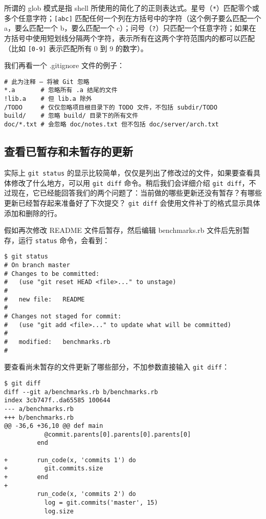 \documentclass[a4paper]{book}
\begin{document}
所谓的 glob 模式是指 shell 所使用的简化了的正则表达式。星号（\texttt{*}）匹配零个或多个任意字符；\texttt{{[}abc{]}} 匹配任何一个列在方括号中的字符（这个例子要么匹配一个 a，要么匹配一个 b，要么匹配一个 c）；问号（\texttt{?}）只匹配一个任意字符；如果在方括号中使用短划线分隔两个字符，表示所有在这两个字符范围内的都可以匹配（比如 \texttt{{[}0-9{]}} 表示匹配所有 0 到 9 的数字）。

我们再看一个 .gitignore 文件的例子：

\begin{shaded}\begin{verbatim}
# 此为注释 – 将被 Git 忽略
*.a       # 忽略所有 .a 结尾的文件
!lib.a    # 但 lib.a 除外
/TODO     # 仅仅忽略项目根目录下的 TODO 文件，不包括 subdir/TODO
build/    # 忽略 build/ 目录下的所有文件
doc/*.txt # 会忽略 doc/notes.txt 但不包括 doc/server/arch.txt
\end{verbatim}\end{shaded}

\subsection{查看已暂存和未暂存的更新}

实际上 \texttt{git status} 的显示比较简单，仅仅是列出了修改过的文件，如果要查看具体修改了什么地方，可以用 \texttt{git diff} 命令。稍后我们会详细介绍 \texttt{git diff}，不过现在，它已经能回答我们的两个问题了：当前做的哪些更新还没有暂存？有哪些更新已经暂存起来准备好了下次提交？ \texttt{git diff} 会使用文件补丁的格式显示具体添加和删除的行。

假如再次修改 README 文件后暂存，然后编辑 benchmarks.rb 文件后先别暂存，运行 \texttt{status} 命令，会看到：

\begin{shaded}\begin{verbatim}
$ git status
# On branch master
# Changes to be committed:
#   (use "git reset HEAD <file>..." to unstage)
#
#	new file:   README
#
# Changes not staged for commit:
#   (use "git add <file>..." to update what will be committed)
#
#	modified:   benchmarks.rb
#
\end{verbatim}\end{shaded}

要查看尚未暂存的文件更新了哪些部分，不加参数直接输入 \texttt{git diff}：

\begin{shaded}\begin{verbatim}
$ git diff
diff --git a/benchmarks.rb b/benchmarks.rb
index 3cb747f..da65585 100644
--- a/benchmarks.rb
+++ b/benchmarks.rb
@@ -36,6 +36,10 @@ def main
           @commit.parents[0].parents[0].parents[0]
         end

+        run_code(x, 'commits 1') do
+          git.commits.size
+        end
+
         run_code(x, 'commits 2') do
           log = git.commits('master', 15)
           log.size
\end{verbatim}\end{shaded}
\end{document}
